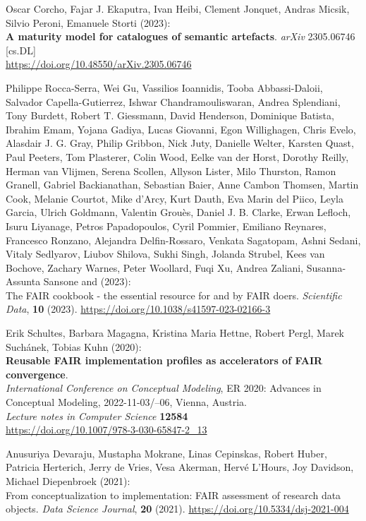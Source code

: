 \begin{thebibliography}{9}
Oscar Corcho, Fajar J. Ekaputra, Ivan Heibi, Clement Jonquet, Andras
Micsik, Silvio Peroni, Emanuele Storti (2023): \\
\textbf{A maturity model for catalogues of semantic artefacts}. 
\emph{arXiv} 2305.06746 [cs.DL] \\
\url{https://doi.org/10.48550/arXiv.2305.06746}

Philippe Rocca-Serra, Wei Gu, Vassilios Ioannidis, Tooba Abbassi-Daloii,
Salvador Capella-Gutierrez, Ishwar Chandramouliswaran, Andrea
Splendiani, Tony Burdett, Robert T. Giessmann, David Henderson,
Dominique Batista, Ibrahim Emam, Yojana Gadiya, Lucas Giovanni, Egon
Willighagen, Chris Evelo, Alasdair J. G. Gray, Philip Gribbon, Nick
Juty, Danielle Welter, Karsten Quast, Paul Peeters, Tom Plasterer, Colin
Wood, Eelke van der Horst, Dorothy Reilly, Herman van Vlijmen, Serena
Scollen, Allyson Lister, Milo Thurston, Ramon Granell, Gabriel
Backianathan, Sebastian Baier, Anne Cambon Thomsen, Martin Cook, Melanie
Courtot, Mike d'Arcy, Kurt Dauth, Eva Marin del Piico, Leyla Garcia,
Ulrich Goldmann, Valentin Grouès, Daniel J. B. Clarke, Erwan Lefloch,
Isuru Liyanage, Petros Papadopoulos, Cyril Pommier, Emiliano Reynares,
Francesco Ronzano, Alejandra Delfin-Rossaro, Venkata Sagatopam, Ashni
Sedani, Vitaly Sedlyarov, Liubov Shilova, Sukhi Singh, Jolanda Strubel,
Kees van Bochove, Zachary Warnes, Peter Woollard, Fuqi Xu, Andrea
Zaliani, Susanna-Assunta Sansone and (2023): \\
The {FAIR} cookbook -
the essential resource for and by {FAIR} doers. \emph{Scientific Data},
\textbf{10} (2023).
\url{https://doi.org/10.1038/s41597-023-02166-3}

Erik Schultes, Barbara Magagna, Kristina Maria Hettne, Robert Pergl,
Marek Suchánek, Tobias Kuhn (2020): \\
\textbf{Reusable {FAIR} implementation profiles as accelerators of {FAIR} convergence}.\\
\emph{International Conference on Conceptual Modeling}, ER 2020: Advances in Conceptual Modeling, 2022-11-03/--06, Vienna, Austria. \\
\emph{Lecture notes in Computer Science} \textbf{12584} \\ 
\url{https://doi.org/10.1007/978-3-030-65847-2_13}

Anusuriya Devaraju, Mustapha Mokrane, Linas Cepinskas, Robert Huber,
Patricia Herterich, Jerry de Vries, Vesa Akerman, Hervé L'Hours, Joy
Davidson, Michael Diepenbroek (2021): \\
From conceptualization to
implementation: {FAIR} assessment of research data objects. \emph{Data
Science Journal}, \textbf{20} (2021).
\url{https://doi.org/10.5334/dsj-2021-004}


\end{thebibliography}
